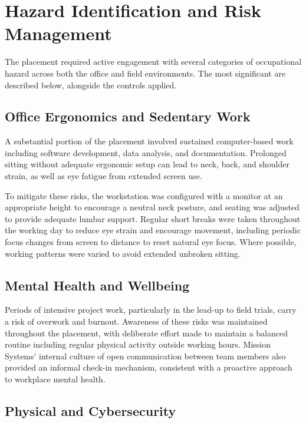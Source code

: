 \section*{Hazard Identification and Risk Management}
 
The placement required active engagement with several categories of occupational hazard
across both the office and field environments. The most significant are described below,
alongside the controls applied.
 
\subsection*{Office Ergonomics and Sedentary Work}
 
A substantial portion of the placement involved sustained computer-based work including
software development, data analysis, and documentation. Prolonged sitting without adequate
ergonomic setup can lead to neck, back, and shoulder strain, as well as eye fatigue from
extended screen use.
 
To mitigate these risks, the workstation was configured with a monitor at an appropriate
height to encourage a neutral neck posture, and seating was adjusted to provide adequate
lumbar support. Regular short breaks were taken throughout the working day to reduce eye
strain and encourage movement, including periodic focus changes from screen to distance to
reset natural eye focus. Where possible, working patterns were varied to avoid extended
unbroken sitting.
 
\subsection*{Mental Health and Wellbeing}
 
Periods of intensive project work, particularly in the lead-up to field trials, carry a risk
of overwork and burnout. Awareness of these risks was maintained throughout the placement,
with deliberate effort made to maintain a balanced routine including regular physical activity
outside working hours. Mission Systems' internal culture of open communication between team
members also provided an informal check-in mechanism, consistent with a proactive approach
to workplace mental health.
 
\subsection*{Physical and Cybersecurity}
 
